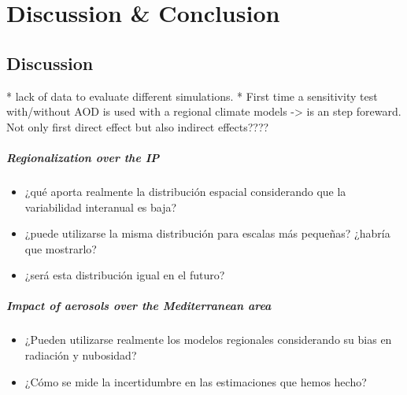\part{Discussion \& Conclusion}


\chapter{Discussion}


* lack of data to evaluate different simulations.
* First time a sensitivity test with/without AOD is used with a regional climate models -> is an step foreward. Not only first direct effect but also indirect effects????

\subsubsection{Regionalization over the IP}

\begin{itemize}
\item ¿qué aporta realmente la distribución espacial considerando que la variabilidad interanual es baja?
\item ¿puede utilizarse la misma distribución para escalas más pequeñas? ¿habría que mostrarlo?   
\item ¿será esta distribución igual en el futuro?
\end{itemize}  
\subsubsection{Impact of aerosols over the Mediterranean area}

\begin{itemize}
\item ¿Pueden utilizarse realmente los modelos regionales considerando su bias en radiación y nubosidad?
\item ¿Cómo se mide la incertidumbre en las estimaciones que hemos hecho?
\end{itemize}

